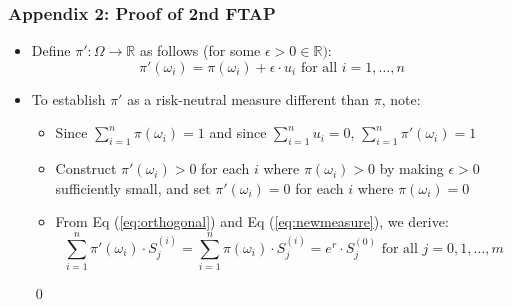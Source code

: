 \documentclass{beamer}
\begin{document}
\begin{frame}
\frametitle{Appendix 2: Proof of 2nd FTAP}
\begin{itemize}
\item Define $\pi' : \Omega \rightarrow \mathbb{R}$ as follows (for some $\epsilon > 0 \in \mathbb{R})$:
\begin{equation}
\pi'(\omega_i) = \pi(\omega_i) + \epsilon \cdot u_i \mbox{ for all } i = 1, \ldots, n \label{eq:newmeasure}
\end{equation}
\item To establish $\pi'$ as a risk-neutral measure different than $\pi$, note:
\begin{itemize}
\item Since $\sum_{i=1}^n \pi(\omega_i) = 1$ and since $\sum_{i=1}^n u_i = 0$, $\sum_{i=1}^n \pi'(\omega_i) = 1$
\item Construct $\pi'(\omega_i) > 0$ for each $i$ where $\pi(\omega_i) > 0$ by making $\epsilon > 0$ sufficiently small, and set $\pi'(\omega_i) = 0$ for each $i$ 
where $\pi(\omega_i) = 0$
\item From Eq (\ref{eq:orthogonal}) and Eq (\ref{eq:newmeasure}), we derive:
$$\sum_{i=1}^n \pi'(\omega_i) \cdot S_j^{(i)} = \sum_{i=1}^n \pi(\omega_i) \cdot S_j^{(i)} = e^r \cdot S_j^{(0)} \mbox{ for all } j = 0, 1, \ldots, m$$
\end{itemize}
\qed
\end{itemize}
\end{frame}
\end{document}

